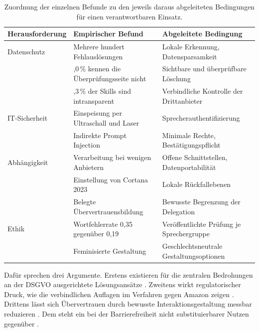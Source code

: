 \begin{table}[!htb]
	\centering
	\small
	\setlength{\extrarowheight}{2pt}
	\renewcommand{\arraystretch}{1.1}
	\begin{tabularx}{\textwidth}{@{}
			>{\raggedright\arraybackslash}p{2.85cm}
			>{\raggedright\arraybackslash}X
			>{\raggedright\arraybackslash}X @{}}
		\hline
		\textbf{Herausforderung} & \textbf{Empirischer Befund} & \textbf{Abgeleitete Bedingung} \\ \hline
		Datenschutz   & Mehrere hundert Fehlauslösungen              & Lokale Erkennung, Datensparsamkeit \\
		              & 56,0\,\% kennen die Überprüfungsseite nicht  & Sichtbare und überprüfbare Löschung \\
		              & 23,3\,\% der Skills sind intransparent       & Verbindliche Kontrolle der Drittanbieter \\ \hline
		IT-Sicherheit & Einspeisung per Ultraschall und Laser        & Sprecherauthentifizierung \\
		              & Indirekte Prompt Injection                   & Minimale Rechte, Bestätigungspflicht \\ \hline
		Abhängigkeit  & Verarbeitung bei wenigen Anbietern           & Offene Schnittstellen, Datenportabilität \\
		              & Einstellung von Cortana 2023                 & Lokale Rückfallebenen \\
		              & Belegte Übervertrauensbildung                & Bewusste Begrenzung der Delegation \\ \hline
		Ethik         & Wortfehlerrate 0,35 gegenüber 0,19           & Veröffentlichte Prüfung je Sprechergruppe \\
		              & Feminisierte Gestaltung                      & Geschlechtsneutrale Gestaltungsoptionen \\ \hline
	\end{tabularx}
	\caption[Herausforderungen und abgeleitete Bedingungen]{Zuordnung der einzelnen Befunde zu den jeweils daraus abgeleiteten Bedingungen für einen verantwortbaren Einsatz.}
	\label{tab:bedingungen}
\end{table}

Dafür sprechen drei Argumente. Erstens existieren für die zentralen Bedrohungen an der \ac{DSGVO} ausgerichtete Lösungsansätze \cite{HernandezAcosta2022}. Zweitens wirkt regulatorischer Druck, wie die verbindlichen Auflagen im Verfahren gegen Amazon zeigen \cite{ftc2023amazon}. Drittens lässt sich Übervertrauen durch bewusste Interaktionsgestaltung messbar reduzieren \cite{bucinca2021trust}. Dem steht ein bei der Barrierefreiheit nicht substituierbarer Nutzen gegenüber \cite{Esquivel2024}.


